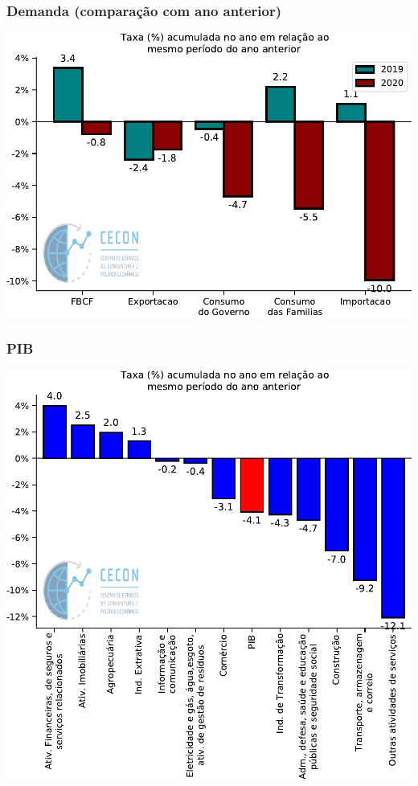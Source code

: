 \documentclass{SelfArx}
\begin{document}
\subsubsection*{Demanda (comparação com ano anterior)}
\label{sec:orgcac6311}

\begin{center}
\includegraphics[width=.9\linewidth]{./figs/PIB/Demanda_Acum_Comparativo.pdf}
\end{center}

\subsubsection*{PIB}
\label{sec:orgdd73238}

\begin{center}
\includegraphics[width=.9\linewidth]{./figs/PIB/PIB_Acum.pdf}
\end{center}
\end{document}
